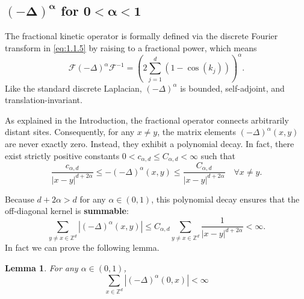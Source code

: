 \documentclass[11pt, a4paper, UKenglish, oneside]{book}
\theoremstyle{plain}
\newtheorem{lemma}[theorem]{Lemma}
\theoremstyle{remark}
\theoremstyle{definition}
\numberwithin{equation}{section}
\numberwithin{theorem}{section}
\begin{document}
\subsection*{$\boldsymbol{(- \Delta)^{\alpha}}$ for $\boldsymbol{0<\alpha<1}$}

The fractional kinetic operator is formally defined via the discrete Fourier transform in \eqref{eq:1.1.5} by raising to a fractional power, which means 
\[
\mathcal{F} (-\Delta)^\alpha \mathcal{F}^{-1} = \left( 2 \sum_{j=1}^d ( 1-\cos(k_j)) \right)^{\alpha}.
\]
Like the standard discrete Laplacian, $(-\Delta)^\alpha$ is bounded, self-adjoint, and translation-invariant. 

As explained in the Introduction, the fractional operator connects arbitrarily distant sites. Consequently, for any $x \ne y$, the matrix elements $(-\Delta)^\alpha(x,y)$ are never exactly zero. Instead, they exhibit a polynomial decay. In fact, there exist strictly positive constants $0 < c_{\alpha,d} \le C_{\alpha,d} < \infty$ such that
\begin{equation}
\frac{c_{\alpha,d}}{|x-y|^{d+2\alpha}} \le -(-\Delta)^{\alpha}(x,y) \le \frac{C_{\alpha,d}}{|x-y|^{d+2\alpha}} \quad \forall x \ne y. \label{eq:fractionalbound}
\end{equation}

Because $d+2\alpha > d$ for any $\alpha \in (0,1)$, this polynomial decay ensures that the off-diagonal kernel is \textbf{summable}:
\begin{equation}
    \sum_{y \ne x \in \mathbb{Z}^{d}} |(-\Delta)^{\alpha}(x,y)| \le C_{\alpha,d} \sum_{y \ne x \in \mathbb{Z}^{d}} \frac{1}{|x-y|^{d+2\alpha}} < \infty. \label{eq: summabilityfrackernel}
\end{equation} 
In fact we can prove the following lemma.
\begin{lemma}\label{lemma:summability.1}
    For any $\alpha \in (0,1)$,
    \begin{equation}
    \sum_{x \in \mathbb{Z}^{d}} |(-\Delta)^{\alpha} (0,x)| < \infty \label{eq:Dsbound}
\end{equation}
\end{lemma}
\end{document}
